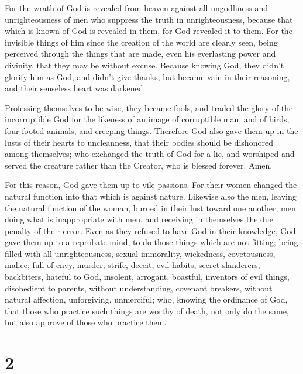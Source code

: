  For the wrath of God is revealed from heaven against all
ungodliness and unrighteousness of men who suppress the truth in
unrighteousness,  because that which is known of God is
revealed in them, for God revealed it to them.  For the
invisible things of him since the creation of the world are clearly
seen, being perceived through the things that are made, even his
everlasting power and divinity, that they may be without excuse.
 Because knowing God, they didn't glorify him as God, and
didn't give thanks, but became vain in their reasoning, and their
senseless heart was darkened.

 Professing themselves to be wise, they became fools,
 and traded the glory of the incorruptible God for the
likeness of an image of corruptible man, and of birds, four-footed
animals, and creeping things.  Therefore God also gave them
up in the lusts of their hearts to uncleanness, that their bodies should
be dishonored among themselves;  who exchanged the truth of
God for a lie, and worshiped and served the creature rather than the
Creator, who is blessed forever. Amen.

 For this reason, God gave them up to vile passions. For
their women changed the natural function into that which is against
nature.  Likewise also the men, leaving the natural
function of the woman, burned in their lust toward one another, men
doing what is inappropriate with men, and receiving in themselves the
due penalty of their error.  Even as they refused to have
God in their knowledge, God gave them up to a reprobate mind, to do
those things which are not fitting;  being filled with all
unrighteousness, sexual immorality, wickedness, covetousness, malice;
full of envy, murder, strife, deceit, evil habits, secret slanderers,
 backbiters, hateful to God, insolent, arrogant, boastful,
inventors of evil things, disobedient to parents,  without
understanding, covenant breakers, without natural affection,
unforgiving, unmerciful;  who, knowing the ordinance of
God, that those who practice such things are worthy of death, not only
do the same, but also approve of those who practice them.

\hypertarget{section-1}{%
\section{2}\label{section-1}}

